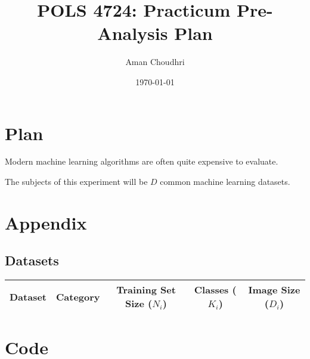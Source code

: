 \documentclass[11pt, oneside]{article}
\title{POLS 4724: Practicum Pre-Analysis Plan}
\author{Aman Choudhri}
\date{\today}
\begin{document}
\maketitle

\section*{Plan}

Modern machine learning algorithms are often quite expensive to evaluate.

The subjects of this experiment will be $D$ common machine learning datasets.


\newpage

\section*{Appendix}

\subsection*{Datasets}



\begin{center}
    \begin{tabular}{c|c|c|c|c}
        Dataset & Category & Training Set Size ($N_i$) & Classes ($K_i$) & Image Size ($D_i$) \\
        \hline
    \end{tabular}
\end{center}

\newpage

\section*{Code}
\end{document}

